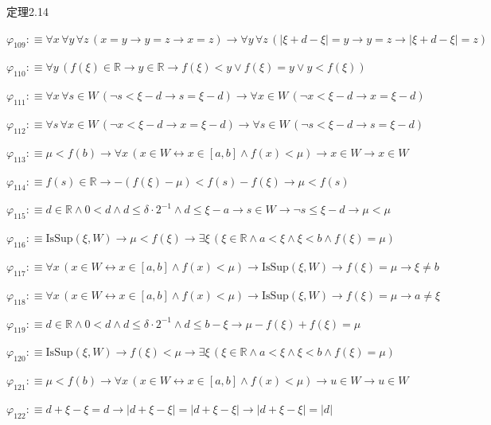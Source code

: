 \begin{fullproof}{定理2.14}
\begin{abbrevlist}
\item $\varphi_{109} :\equiv \forall x\,\forall y\,\forall z\,(x = y \to y = z \to x = z) \to \forall y\,\forall z\,(\lvert \xi + d - \xi \rvert = y \to y = z \to \lvert \xi + d - \xi \rvert = z)$
\item $\varphi_{110} :\equiv \forall y\,(f(\xi) \in \mathbb{R} \to y \in \mathbb{R} \to f(\xi) < y \lor f(\xi) = y \lor y < f(\xi))$
\item $\varphi_{111} :\equiv \forall x\,\forall s \in W\,(\neg s < \xi - d \to s = \xi - d) \to \forall x \in W\,(\neg x < \xi - d \to x = \xi - d)$
\item $\varphi_{112} :\equiv \forall s\,\forall x \in W\,(\neg x < \xi - d \to x = \xi - d) \to \forall s \in W\,(\neg s < \xi - d \to s = \xi - d)$
\item $\varphi_{113} :\equiv \mu < f(b) \to \forall x\,(x \in W \leftrightarrow x \in [a,b] \land f(x) < \mu) \to x \in W \to x \in W$
\item $\varphi_{114} :\equiv f(s) \in \mathbb{R} \to -(f(\xi) - \mu) < f(s) - f(\xi) \to \mu < f(s)$
\item $\varphi_{115} :\equiv d \in \mathbb{R} \land 0 < d \land d \leq \delta \cdot 2^{-1} \land d \leq \xi - a \to s \in W \to \neg s \leq \xi - d \to \mu < \mu$
\item $\varphi_{116} :\equiv \mathrm{IsSup}(\xi,W) \to \mu < f(\xi) \to \exists \xi\,(\xi \in \mathbb{R} \land a < \xi \land \xi < b \land f(\xi) = \mu)$
\item $\varphi_{117} :\equiv \forall x\,(x \in W \leftrightarrow x \in [a,b] \land f(x) < \mu) \to \mathrm{IsSup}(\xi,W) \to f(\xi) = \mu \to \xi \neq b$
\item $\varphi_{118} :\equiv \forall x\,(x \in W \leftrightarrow x \in [a,b] \land f(x) < \mu) \to \mathrm{IsSup}(\xi,W) \to f(\xi) = \mu \to a \neq \xi$
\item $\varphi_{119} :\equiv d \in \mathbb{R} \land 0 < d \land d \leq \delta \cdot 2^{-1} \land d \leq b - \xi \to \mu - f(\xi) + f(\xi) = \mu$
\item $\varphi_{120} :\equiv \mathrm{IsSup}(\xi,W) \to f(\xi) < \mu \to \exists \xi\,(\xi \in \mathbb{R} \land a < \xi \land \xi < b \land f(\xi) = \mu)$
\item $\varphi_{121} :\equiv \mu < f(b) \to \forall x\,(x \in W \leftrightarrow x \in [a,b] \land f(x) < \mu) \to u \in W \to u \in W$
\item $\varphi_{122} :\equiv d + \xi - \xi = d \to \lvert d + \xi - \xi \rvert = \lvert d + \xi - \xi \rvert \to \lvert d + \xi - \xi \rvert = \lvert d \rvert$

\end{abbrevlist}
\end{fullproof}
